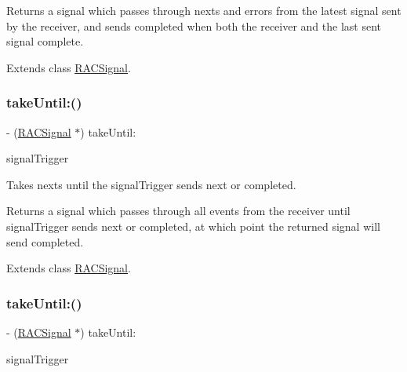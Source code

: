 Returns a signal which passes through {\ttfamily next}s and {\ttfamily error}s from the latest signal sent by the receiver, and sends {\ttfamily completed} when both the receiver and the last sent signal complete. 

Extends class \mbox{\hyperlink{interface_r_a_c_signal_a0a6780c4580e1a5338a9a891f7c69ea1}{R\+A\+C\+Signal}}.

\mbox{\label{category_r_a_c_signal_07_operations_08_afb214e9e69dc34880b306c118b8e56d4}} 
\subsubsection{\texorpdfstring{take\+Until\+:()}{takeUntil:()}\hspace{0.1cm}{\footnotesize\ttfamily [1/3]}}
{\footnotesize\ttfamily -\/ (\mbox{\hyperlink{interface_r_a_c_signal}{R\+A\+C\+Signal}} $\ast$) take\+Until\+: \begin{DoxyParamCaption}\item[{(\mbox{\hyperlink{interface_r_a_c_signal}{R\+A\+C\+Signal}} $\ast$)}]{signal\+Trigger }\end{DoxyParamCaption}}

Takes {\ttfamily next}s until the {\ttfamily signal\+Trigger} sends {\ttfamily next} or {\ttfamily completed}.

Returns a signal which passes through all events from the receiver until {\ttfamily signal\+Trigger} sends {\ttfamily next} or {\ttfamily completed}, at which point the returned signal will send {\ttfamily completed}. 

Extends class \mbox{\hyperlink{interface_r_a_c_signal_afb214e9e69dc34880b306c118b8e56d4}{R\+A\+C\+Signal}}.

\mbox{\label{category_r_a_c_signal_07_operations_08_afb214e9e69dc34880b306c118b8e56d4}} 
\subsubsection{\texorpdfstring{take\+Until\+:()}{takeUntil:()}\hspace{0.1cm}{\footnotesize\ttfamily [2/3]}}
{\footnotesize\ttfamily -\/ (\mbox{\hyperlink{interface_r_a_c_signal}{R\+A\+C\+Signal}} $\ast$) take\+Until\+: \begin{DoxyParamCaption}\item[{(\mbox{\hyperlink{interface_r_a_c_signal}{R\+A\+C\+Signal}} $\ast$)}]{signal\+Trigger }\end{DoxyParamCaption}}

